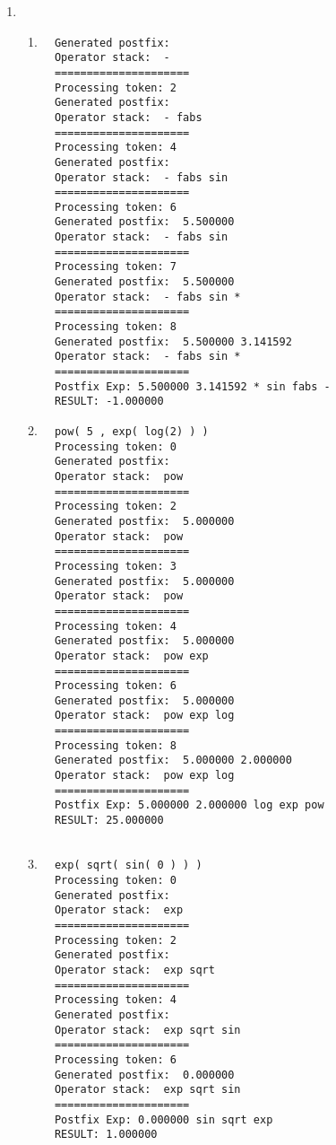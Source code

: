 \documentclass[fleqn,a4paper,12pt]{article}
\begin{document}
\begin{enumerate}
   \item
     \begin{enumerate}
     \item
       \begin{lstlisting}
  Generated postfix: 
  Operator stack:  -
  =====================
  Processing token: 2
  Generated postfix: 
  Operator stack:  - fabs
  =====================
  Processing token: 4
  Generated postfix: 
  Operator stack:  - fabs sin
  =====================
  Processing token: 6
  Generated postfix:  5.500000
  Operator stack:  - fabs sin
  =====================
  Processing token: 7
  Generated postfix:  5.500000
  Operator stack:  - fabs sin *
  =====================
  Processing token: 8
  Generated postfix:  5.500000 3.141592
  Operator stack:  - fabs sin *
  =====================
  Postfix Exp: 5.500000 3.141592 * sin fabs -
  RESULT: -1.000000
       \end{lstlisting}

     \item
       \begin{lstlisting}
  pow( 5 , exp( log(2) ) )
  Processing token: 0
  Generated postfix: 
  Operator stack:  pow
  =====================
  Processing token: 2
  Generated postfix:  5.000000
  Operator stack:  pow
  =====================
  Processing token: 3
  Generated postfix:  5.000000
  Operator stack:  pow
  =====================
  Processing token: 4
  Generated postfix:  5.000000
  Operator stack:  pow exp
  =====================
  Processing token: 6
  Generated postfix:  5.000000
  Operator stack:  pow exp log
  =====================
  Processing token: 8
  Generated postfix:  5.000000 2.000000
  Operator stack:  pow exp log
  =====================
  Postfix Exp: 5.000000 2.000000 log exp pow
  RESULT: 25.000000
  
      \end{lstlisting}

    \item
      \begin{lstlisting}
  exp( sqrt( sin( 0 ) ) )
  Processing token: 0
  Generated postfix: 
  Operator stack:  exp
  =====================
  Processing token: 2
  Generated postfix: 
  Operator stack:  exp sqrt
  =====================
  Processing token: 4
  Generated postfix: 
  Operator stack:  exp sqrt sin
  =====================
  Processing token: 6
  Generated postfix:  0.000000
  Operator stack:  exp sqrt sin
  =====================
  Postfix Exp: 0.000000 sin sqrt exp
  RESULT: 1.000000
      \end{lstlisting}
      
    \end{enumerate}
\end{enumerate}
 
\end{document}

